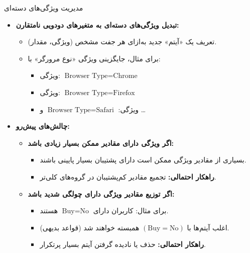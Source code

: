 \begin{frame}{مدیریت ویژگی‌های دسته‌ای}{}
\begin{itemize}\setlength{\itemsep}{4pt}
    \item \textbf{تبدیل ویژگی‌های دسته‌ای به متغیرهای دودویی نامتقارن:}
    \begin{itemize}\setlength{\itemsep}{2pt}
        \item تعریف یک «آیتم» جدید به‌ازای هر جفت مشخص (ویژگی، مقدار).
        \item برای مثال، جایگزینی ویژگی «نوع مرورگر» با:
        \begin{itemize}\footnotesize
            \item ویژگی: $\text{Browser Type} = \text{Chrome}$
            \item ویژگی: $\text{Browser Type} = \text{Firefox}$
            \item ویژگی: $\text{Browser Type} = \text{Safari}$ و \dots
        \end{itemize}
    \end{itemize}
    \vspace{0.15cm}
    \item \textbf{چالش‌های پیش‌رو:}
    \begin{itemize}\setlength{\itemsep}{3pt}
        \item \alert{\textbf{اگر ویژگی دارای مقادیر ممکن بسیار زیادی باشد:}}
        \begin{itemize}\footnotesize
            \item بسیاری از مقادیر ویژگی ممکن است دارای پشتیبان بسیار پایینی باشند.
            \item \textbf{راهکار احتمالی:} تجمیع مقادیر کم‌پشتیبان در گروه‌های کلی‌تر.
        \end{itemize}
        \item \alert{\textbf{اگر توزیع مقادیر ویژگی دارای چولگی شدید باشد:}}
        \begin{itemize}\footnotesize
            \item برای مثال:  کاربران دارای $\text{Buy} = \text{No}$ هستند.
            \item اغلب آیتم‌ها با $(\text{Buy}=\text{No})$ همبسته خواهند شد (قواعد بدیهی).
            \item \textbf{راهکار احتمالی:} حذف یا نادیده گرفتن آیتم بسیار پرتکرار.
        \end{itemize}
    \end{itemize}
\end{itemize}
\end{frame}

